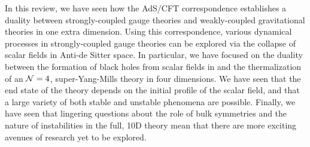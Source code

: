 \documentclass[../PhD.tex]{subfiles}
\begin{document}
In this review, we have seen how the AdS/CFT correspondence establishes a duality between strongly-coupled gauge theories and weakly-coupled gravitational theories in one extra dimension. Using this correspondence, various dynamical processes in strongly-coupled gauge theories can be explored via the collapse of scalar fields in Anti-de Sitter space. In particular, we have focused on the duality between the formation of black holes from scalar fields in \ads and the thermalization of an $\mathcal N = 4$, super-Yang-Mills theory in four dimensions. We have seen that the end state of the theory depends on the initial profile of the scalar field, and that a large variety of both stable and unstable phenomena are possible. Finally, we have seen that lingering questions about the role of bulk symmetries and the nature of instabilities in the full, 10D theory mean that there are more exciting avenues of research yet to be explored.

\end{document}
